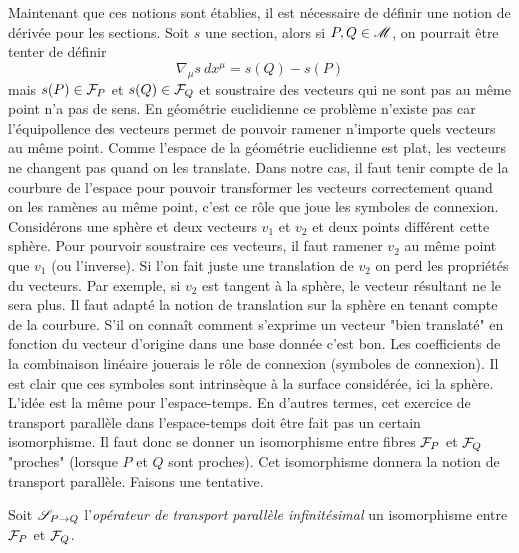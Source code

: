\documentclass[a4paper,11pt]{report}
\begin{document}
                Maintenant que ces notions sont établies, il est nécessaire de définir une notion de dérivée pour les sections. Soit $s$ une section, alors si $P,Q\in\M$, on pourrait être tenter de définir
                \begin{equation}
                    \nabla_\mu s~ dx^\mu = s(Q)-s(P)
                \end{equation}
                 mais $s(P)\in\F_P$ et $s(Q)\in\F_Q$ et soustraire des vecteurs qui ne sont pas au même point n'a pas de sens. En géométrie euclidienne ce problème n'existe pas car l'équipollence des vecteurs permet de pouvoir ramener n'importe quels vecteurs au même point. Comme l'espace de la géométrie euclidienne est plat, les vecteurs ne changent pas quand on les translate. Dans notre cas, il faut tenir compte de la courbure de l'espace pour pouvoir transformer les vecteurs correctement quand on les ramènes au même point, c'est ce rôle que joue les symboles de connexion. Considérons une sphère et deux vecteurs $v_1$ et $v_2$ et deux points différent cette sphère. Pour pourvoir soustraire ces vecteurs, il faut ramener $v_2$ au même point que $v_1$ (ou l'inverse). Si l'on fait juste une translation de $v_2$ on perd les propriétés du vecteurs. Par exemple, si $v_2$ est tangent à la sphère, le vecteur résultant ne le sera plus. Il faut adapté la notion de translation sur la sphère en tenant compte de la courbure. S'il on connaît comment s'exprime un vecteur "bien translaté" en fonction du vecteur d'origine dans une base donnée c'est bon. Les coefficients de la combinaison linéaire jouerais le rôle de connexion (symboles de connexion). Il est clair que ces symboles sont intrinsèque à la surface considérée, ici la sphère. L'idée est la même pour l'espace-temps. En d'autres termes, cet exercice de transport parallèle dans l'espace-temps doit être fait pas un certain isomorphisme. Il faut donc se donner un isomorphisme entre fibres $\F_P$ et $\F_Q$ "proches" (lorsque $P$ et $Q$ sont proches). Cet isomorphisme donnera la notion de transport parallèle. Faisons une tentative.
                 
                 \begin{defn}
                    Soit $\S_{P\to Q}$ l'\textit{opérateur de transport parallèle infinitésimal} un isomorphisme entre $\F_P$ et $\F_Q$.
                 \end{defn}
                 
\end{document}
